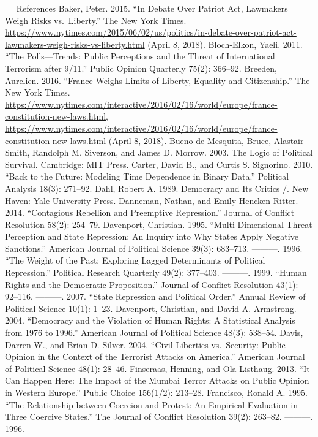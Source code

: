 \documentclass[ignorenonframetext,]{beamer}
\begin{document}
\begin{frame}[fragile]
  References Baker, Peter. 2015. ``In Debate Over Patriot Act, Lawmakers
Weigh Risks vs.~Liberty.'' The New York Times.
\url{https://www.nytimes.com/2015/06/02/us/politics/in-debate-over-patriot-act-lawmakers-weigh-risks-vs-liberty.html}
(April 8, 2018). Bloch-Elkon, Yaeli. 2011. ``The Polls---Trends: Public
Perceptions and the Threat of International Terrorism after 9/11.''
Public Opinion Quarterly 75(2): 366--92. Breeden, Aurelien. 2016.
``France Weighs Limits of Liberty, Equality and Citizenship.'' The New
York Times.
\url{https://www.nytimes.com/interactive/2016/02/16/world/europe/france-constitution-new-laws.html},
\url{https://www.nytimes.com/interactive/2016/02/16/world/europe/france-constitution-new-laws.html}
(April 8, 2018). Bueno de Mesquita, Bruce, Alastair Smith, Randolph M.
Siverson, and James D. Morrow. 2003. The Logic of Political Survival.
Cambridge: MIT Press. Carter, David B., and Curtis S. Signorino. 2010.
``Back to the Future: Modeling Time Dependence in Binary Data.''
Political Analysis 18(3): 271--92. Dahl, Robert A. 1989. Democracy and
Its Critics /. New Haven: Yale University Press. Danneman, Nathan, and
Emily Hencken Ritter. 2014. ``Contagious Rebellion and Preemptive
Repression.'' Journal of Conflict Resolution 58(2): 254--79. Davenport,
Christian. 1995. ``Multi-Dimensional Threat Perception and State
Repression: An Inquiry into Why States Apply Negative Sanctions.''
American Journal of Political Science 39(3): 683--713. ---------. 1996.
``The Weight of the Past: Exploring Lagged Determinants of Political
Repression.'' Political Research Quarterly 49(2): 377--403. ---------.
1999. ``Human Rights and the Democratic Proposition.'' Journal of
Conflict Resolution 43(1): 92--116. ---------. 2007. ``State Repression
and Political Order.'' Annual Review of Political Science 10(1): 1--23.
Davenport, Christian, and David A. Armstrong. 2004. ``Democracy and the
Violation of Human Rights: A Statistical Analysis from 1976 to 1996.''
American Journal of Political Science 48(3): 538--54. Davis, Darren W.,
and Brian D. Silver. 2004. ``Civil Liberties vs.~Security: Public
Opinion in the Context of the Terrorist Attacks on America.'' American
Journal of Political Science 48(1): 28--46. Finseraas, Henning, and Ola
Listhaug. 2013. ``It Can Happen Here: The Impact of the Mumbai Terror
Attacks on Public Opinion in Western Europe.'' Public Choice 156(1/2):
213--28. Francisco, Ronald A. 1995. ``The Relationship between Coercion
and Protest: An Empirical Evaluation in Three Coercive States.'' The
Journal of Conflict Resolution 39(2): 263--82. ---------. 1996.

\end{frame}
\end{document}
